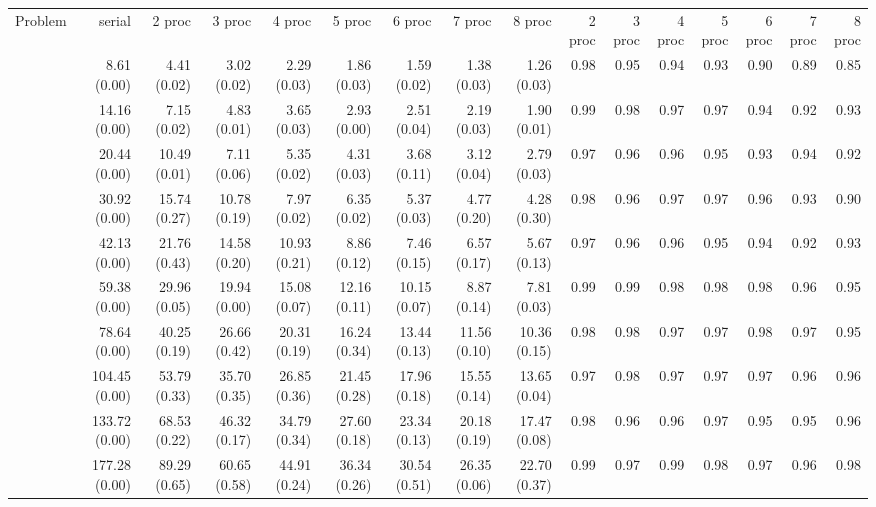 \documentclass[preprint]{tlp}
\begin{document}
\begin{landscape}
\scriptsize
 
\begin{tabular}{@{\extracolsep{\fill}}|c|r|r|r|r|r|r|r|r||r|r|r|r|r|r|r|}
\cline{1-16}

Problem & serial & 2 proc  & 3 proc & 4 proc & 5 proc & 6 proc & 7 proc & 8 proc &  2 proc  & 3 proc & 4 proc & 5 proc & 6 proc & 7 proc & 8 proc\\

\cline{1-16}
 & 8.61 (0.00) &  4.41 (0.02) &  3.02 (0.02) &  2.29 (0.03) &  1.86 (0.03) &  1.59 (0.02) &  1.38 (0.03) &  1.26 (0.03) &  0.98 & 0.95 & 0.94 & 0.93 & 0.90 & 0.89 & 0.85 \\
 & 14.16 (0.00) &  7.15 (0.02) &  4.83 (0.01) &  3.65 (0.03) &  2.93 (0.00) &  2.51 (0.04) &  2.19 (0.03) &  1.90 (0.01) & 0.99 & 0.98 & 0.97 & 0.97 & 0.94 & 0.92 & 0.93 \\
 & 20.44 (0.00) &  10.49 (0.01) &  7.11 (0.06) &  5.35 (0.02) &  4.31 (0.03) &  3.68 (0.11) &  3.12 (0.04) &  2.79 (0.03) & 0.97 & 0.96 & 0.96 & 0.95 & 0.93 & 0.94 & 0.92 \\
 & 30.92 (0.00) &  15.74 (0.27) &  10.78 (0.19) &  7.97 (0.02) &  6.35 (0.02) &  5.37 (0.03) &  4.77 (0.20) &  4.28 (0.30) & 0.98 & 0.96 & 0.97 & 0.97 & 0.96 & 0.93 & 0.90 \\
 & 42.13 (0.00) &  21.76 (0.43) &  14.58 (0.20) &  10.93 (0.21) &  8.86 (0.12) &  7.46 (0.15) &  6.57 (0.17) &  5.67 (0.13) & 0.97 & 0.96 & 0.96 & 0.95 & 0.94 & 0.92 & 0.93 \\
 & 59.38 (0.00) &  29.96 (0.05) &  19.94 (0.00) &  15.08 (0.07) &  12.16 (0.11) &  10.15 (0.07) &  8.87 (0.14) &  7.81 (0.03) & 0.99 & 0.99 & 0.98 & 0.98 & 0.98 & 0.96 & 0.95 \\
 & 78.64 (0.00) &  40.25 (0.19) &  26.66 (0.42) &  20.31 (0.19) &  16.24 (0.34) &  13.44 (0.13) &  11.56 (0.10) &  10.36 (0.15) & 0.98 & 0.98 & 0.97 & 0.97 & 0.98 & 0.97 & 0.95 \\
 & 104.45 (0.00) &  53.79 (0.33) &  35.70 (0.35) &  26.85 (0.36) &  21.45 (0.28) &  17.96 (0.18) &  15.55 (0.14) &  13.65 (0.04) & 0.97 & 0.98 & 0.97 & 0.97 & 0.97 & 0.96 & 0.96 \\
 & 133.72 (0.00) &  68.53 (0.22) &  46.32 (0.17) &  34.79 (0.34) &  27.60 (0.18) &  23.34 (0.13) &  20.18 (0.19) &  17.47 (0.08) & 0.98 & 0.96 & 0.96 & 0.97 & 0.95 & 0.95 & 0.96 \\
 & 177.28 (0.00) &  89.29 (0.65) &  60.65 (0.58) &  44.91 (0.24) &  36.34 (0.26) &  30.54 (0.51) &  26.35 (0.06) &  22.70 (0.37) & 0.99 & 0.97 & 0.99 & 0.98 & 0.97 & 0.96 & 0.98 \\

\end{tabular}
\end{landscape}
\end{document}
